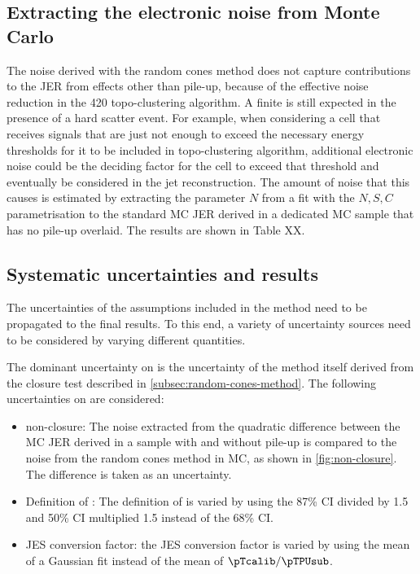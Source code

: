 \subsection{Extracting the electronic noise from Monte Carlo}
The noise derived with the random cones method does not capture contributions to the JER from effects other than pile-up, because of the effective noise reduction in the 420 topo-clustering algorithm. A finite \Nmuzero is still expected in the presence of a hard scatter event.
For example, when considering a cell that receives signals that are just not enough to exceed the necessary energy thresholds for it to be included in topo-clustering algorithm, additional electronic noise could be the deciding factor for the cell to exceed that threshold and eventually be considered in the jet reconstruction.
The amount of noise that this causes is estimated by extracting the parameter $N$ from a fit with the $N, S, C$ parametrisation to the standard MC JER derived in a dedicated MC sample that has no pile-up overlaid.
The results are shown in Table XX.


\subsection{Systematic uncertainties and results}
The uncertainties of the assumptions included in the method need to be propagated to the final results. To this end, a variety of uncertainty sources need to be considered by varying different quantities. 

The dominant uncertainty on \Npileup is the uncertainty of the method itself derived from the closure test described in \cref{subsec:random-cones-method}. The following uncertainties on \Npileup are considered:
\begin{itemize}
    \item \Npileup non-closure:
          The noise extracted from the quadratic difference between the MC JER derived in a sample with and without pile-up is compared to the noise from the random cones method in MC, as shown in \cref{fig:non-closure}. The difference is taken as an uncertainty.
    \item Definition of \sigmaRC:
          The definition of \sigmaRC is varied by using the 87\% CI divided by 1.5 and 50\% CI multiplied 1.5 instead of the 68\% CI.
    \item JES conversion factor: the JES conversion factor is varied by using the mean of a Gaussian fit instead of the mean of $\pTcalib / \pTPUsub$.
\end{itemize}

